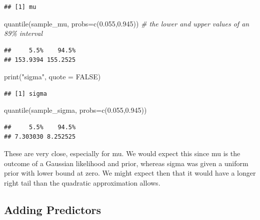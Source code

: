 \documentclass[
]{book}
\newenvironment{Shaded}{\begin{snugshade}}{\end{snugshade}}
\newcommand{\AttributeTok}[1]{\textcolor[rgb]{0.77,0.63,0.00}{#1}}
\newcommand{\CommentTok}[1]{\textcolor[rgb]{0.56,0.35,0.01}{\textit{#1}}}
\newcommand{\ConstantTok}[1]{\textcolor[rgb]{0.00,0.00,0.00}{#1}}
\newcommand{\FloatTok}[1]{\textcolor[rgb]{0.00,0.00,0.81}{#1}}
\newcommand{\FunctionTok}[1]{\textcolor[rgb]{0.00,0.00,0.00}{#1}}
\newcommand{\NormalTok}[1]{#1}
\newcommand{\StringTok}[1]{\textcolor[rgb]{0.31,0.60,0.02}{#1}}
\begin{document}
\begin{verbatim}
## [1] mu
\end{verbatim}

\begin{Shaded}
\begin{Highlighting}[]
\FunctionTok{quantile}\NormalTok{(sample\_mu, }\AttributeTok{probs=}\FunctionTok{c}\NormalTok{(}\FloatTok{0.055}\NormalTok{,}\FloatTok{0.945}\NormalTok{)) }\CommentTok{\# the lower and upper values of an 89\% interval}
\end{Highlighting}
\end{Shaded}

\begin{verbatim}
##     5.5%    94.5% 
## 153.9394 155.2525
\end{verbatim}

\begin{Shaded}
\begin{Highlighting}[]
\FunctionTok{print}\NormalTok{(}\StringTok{"sigma"}\NormalTok{, }\AttributeTok{quote =} \ConstantTok{FALSE}\NormalTok{)}
\end{Highlighting}
\end{Shaded}

\begin{verbatim}
## [1] sigma
\end{verbatim}

\begin{Shaded}
\begin{Highlighting}[]
\FunctionTok{quantile}\NormalTok{(sample\_sigma, }\AttributeTok{probs=}\FunctionTok{c}\NormalTok{(}\FloatTok{0.055}\NormalTok{,}\FloatTok{0.945}\NormalTok{))}
\end{Highlighting}
\end{Shaded}

\begin{verbatim}
##     5.5%    94.5% 
## 7.303030 8.252525
\end{verbatim}

These are very close, especially for mu. We would expect this since mu is the outcome of a Gaussian likelihood and prior, whereas sigma was given a uniform prior with lower bound at zero. We might expect then that it would have a longer right tail than the quadratic approximation allows.

\hypertarget{adding-predictors}{%
\subsection{Adding Predictors}\label{adding-predictors}}
\end{document}
